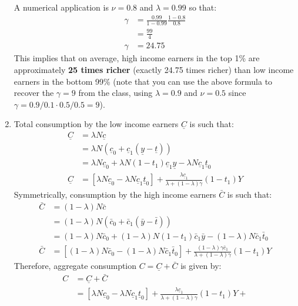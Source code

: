 \documentclass[]{book}
\theoremstyle{definition}
\theoremstyle{definition}
\theoremstyle{definition}
\theoremstyle{remark}
\begin{document}
\begin{enumerate}
\[  \] A numerical application is \(\nu=0.8\) and \(\lambda = 0.99\) so
  that: \[
  \begin{aligned}
  \gamma &= \frac{0.99}{1-0.99}\frac{1-0.8}{0.8}\\
   &= \frac{99}{4} \\
  \gamma &= 24.75
  \end{aligned}
  \] This implies that on average, high income earners in the top 1\%
  are approximately \textbf{25 times richer} (exactly 24.75 times
  richer) than low income earners in the bottom 99\% (note that you can
  use the above formula to recover the \(\gamma = 9\) from the class,
  using \(\lambda = 0.9\) and \(\nu = 0.5\) since
  \(\gamma = 0.9/0.1 \cdot0.5/0.5 = 9\)).
\item
  Total consumption by the low income earners \(\underline{C}\) is such
  that: \[
  \begin{aligned}
  \underline{C}&=\lambda N \underline{c}\\
  &=\lambda N \left(\underline{c}_{0}+\underline{c}_{1}(\underline{y}-\underline{t})\right)\\
  &=\lambda N  \underline{c}_{0} + \lambda N  (1-t_1) \underline{c}_{1}\underline{y}-\lambda N  \underline{c}_{1} \underline{t}_0\\
  \underline{C}&=\left[\lambda N  \underline{c}_{0}-\lambda  N \underline{c}_{1} \underline{t}_0 \right]+ \frac{\lambda \underline{c}_{1}}{\lambda+(1-\lambda)\gamma}(1-t_1)Y
  \end{aligned}
  \] Symmetrically, consumption by the high income earners \(\bar{C}\)
  is such that: \[
  \begin{aligned}
  \bar{C}&=(1-\lambda) N \bar{c}\\
  &=(1-\lambda) N \left(\bar{c}_{0}+\bar{c}_{1}(\bar{y}-\bar{t})\right)\\
  &=(1-\lambda) N  \bar{c}_{0} + (1-\lambda) N (1-t_1) \bar{c}_{1}\bar{y}-(1-\lambda) N  \bar{c}_{1} \bar{t}_0\\
  \bar{C}&=\left[(1-\lambda) N  \bar{c}_{0}-(1-\lambda) N  \bar{c}_{1} \bar{t}_0\right] + \frac{(1-\lambda) \gamma\bar{c}_{1}}{\lambda+(1-\lambda)\gamma}(1-t_1)Y
  \end{aligned}
  \] Therefore, aggregate consumption \(C=\underline{C} + \bar{C}\) is
  given by: \[
  \begin{aligned}
  C&=\underline{C} + \bar{C}\\
  &=\left[\lambda N  \underline{c}_{0}-\lambda  N \underline{c}_{1} \underline{t}_0 \right]+ \frac{\lambda \underline{c}_{1}}{\lambda+(1-\lambda)\gamma}(1-t_1)Y + 

\end{aligned}\]
\end{enumerate}
\end{document}
